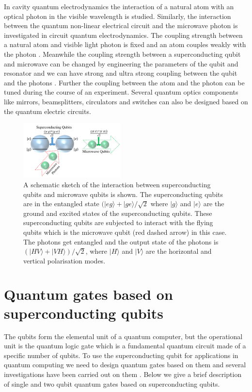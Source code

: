 \documentclass[twocolumn, aps, rmp, amsmath, amssymb, nofootinbib, superscriptaddress, longbibliography, floatfix, table-of-contents, eqsecnum]{revtex4-1}
\newcommand{\ket}[1]{|#1\rangle}
\begin{document}
In cavity quantum electrodynamics the interaction of a natural atom with an optical photon in the visible wavelength is studied. Similarly, the interaction between the quantum non-linear electrical circuit and the microwave photon is investigated in circuit quantum electrodynamics. The coupling strength between a natural atom and visible light photon is fixed and an atom couples weakly with the photon \cite{bib:raimond2001manipulating}. Meanwhile the coupling strength between a superconducting qubit and microwave can be changed by engineering the parameters of the qubit and resonator and we can have strong and ultra strong coupling between the qubit and the photons \cite{bib:wallraff2004strong}. Further the coupling between the atom and the photon can be tuned during the course of an experiment. Several quantum optics components like mirrors, beamsplitters, circulators and switches can also be designed based on the quantum electric circuits.

\begin{figure}[!htbp]
\includegraphics[width=0.475\textwidth]{microwave_qubits}
\caption{A schematic sketch of the interaction between superconducting qubits and microwave qubits is shown. The superconducting qubits are in the entangled state $(\ket{e g} + \ket{g e }/\sqrt{2}$ where $\ket{g}$ and $\ket{e}$ are the ground and excited states of the superconducting qubits. These superconducting qubits are subjected to interact with the flying qubits which is the microwave qubit (red dashed arrow) in this case. The photons get entangled and the output state of the photons is $(\ket{H V} + \ket{V H})/\sqrt{2}$, where $\ket{H}$ and $\ket{V}$ are the horizontal and vertical polarisation modes.}\label{fig:microwave_qubits}
\end{figure}

\section{Quantum gates based on superconducting qubits}

The qubits form the elemental unit of a quantum computer, but the operational unit is the quantum logic gate which is a fundamental quantum circuit made of a specific number of qubits. To use the superconducting qubit for applications in quantum computing we need to design quantum gates based on them and several investigations have been carried out on them \cite{bib:blais2004cavity, bib:chow2011simple, bib:chow2013microwave}. Below we give a brief description of single and two qubit quantum gates based on superconducting qubits.
\end{document}
